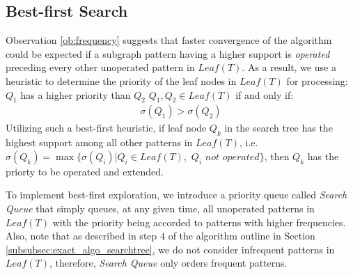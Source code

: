 \subsection{Best-first Search}
\label{subsubsec:exact_algo_bestfs}
Observation \ref{ob:frequency} suggests that faster convergence of the algorithm
could be expected if a subgraph pattern having a higher support is
\textit{operated} preceding every other unoperated pattern in $Leaf(T)$. As a result, we
use a heuristic to determine the priority of the leaf nodes in $Leaf(T)$
for processing: $Q_1$ has a higher priority than $Q_2$ \forall $Q_1, Q_2 \in Leaf(T)$ if and only if:
\begin{align*}\sigma(Q_1)>\sigma(Q_2)\end{align*}
Utilizing such a best-first heuristic, if leaf node $Q_k$ in the search tree has
the highest support among all other patterns in $Leaf(T)$, i.e. $\sigma(Q_k)=\max\{\sigma(Q_i)|Q_i\in Leaf(T),$ $Q_i$ $not$ $operated\}$, 
then $Q_k$ has the priorty to be operated and extended.
\par To implement best-first exploration, we introduce a priority queue called \textit{Search Queue} that simply queues,
 at any given time, all unoperated patterns in $Leaf(T)$ with the priority being accorded to patterns with higher frequencies. Also,
 note that as described in step $4$ of the algorithm outline in Section \ref{subsubsec:exact_algo_searchtree}, we do not consider 
 infrequent patterns in $Leaf(T)$, therefore, \textit{Search Queue} only orders frequent patterns. 

